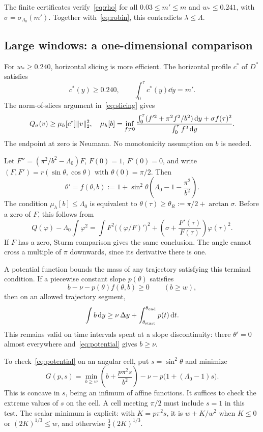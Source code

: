 The finite certificates verify~\eqref{eq:rho} for all $0.03\le m'\le m$ and $w_*\le0.241$, with $\sigma=\sigma_{\Lambda_0}(m')$. Together with~\eqref{eq:robin}, this contradicts $\lambda\le\Lambda$.

\subsection{Large windows: a one-dimensional comparison}
For $w_*\ge0.240$, horizontal slicing is more efficient. The horizontal profile $c^*$ of $D^*$ satisfies
\[
 c^*(y)\ge0.240,\qquad \int_0^\tau c^*(y)\dd y=m'.
\]
The norm-of-slices argument in~\eqref{eq:slicing} gives
\[
 Q_\sigma(v)\ge \mu_h[c^*]\lVert v\rVert_2^2,
\quad
 \mu_h[b]=\inf_{f\ne0}
 \frac{\int_0^\tau(f'^2+\pi^2f^2/b^2)\,\mathrm d y+\sigma f(\tau)^2}
      {\int_0^\tau f^2\,\mathrm d y}.
\]
The endpoint at zero is Neumann. No monotonicity assumption on $b$ is needed.

Let $F''=(\pi^2/b^2-\Lambda_0)F$, $F(0)=1$, $F'(0)=0$, and write $(F,F')=r(\sin\theta,\cos\theta)$ with $\theta(0)=\pi/2$. Then
\begin{equation}\label{eq:prufer-S}
 \theta'=f(\theta,b):=1+\sin^2\theta\left(\Lambda_0-1-\frac{\pi^2}{b^2}\right).
\end{equation}
The condition $\mu_h[b]\le\Lambda_0$ is equivalent to $\theta(\tau)\ge\theta_R:=\pi/2+\arctan\sigma$. Before a zero of $F$, this follows from
\[
 Q(\varphi)-\Lambda_0\int\varphi^2
 =\int F^2\bigl((\varphi/F)'\bigr)^2
   +\left(\sigma+\frac{F'(\tau)}{F(\tau)}\right)\varphi(\tau)^2.
\]
If $F$ has a zero, Sturm comparison gives the same conclusion. The angle cannot cross a multiple of $\pi$ downwards, since its derivative there is one.

A potential function bounds the mass of any trajectory satisfying this terminal condition. If a piecewise constant slope $p(\theta)$ satisfies
\begin{equation}\label{eq:potential}
 b-\nu-p(\theta)f(\theta,b)\ge0\qquad(b\ge w),
\end{equation}
then on an allowed trajectory segment,
\[
 \int b\,\mathrm d y\ge \nu\,\Delta y+\int_{\theta_{\rm start}}^{\theta_{\rm end}}p(t)\,\mathrm d t.
\]
This remains valid on time intervals spent at a slope discontinuity: there $\theta'=0$ almost everywhere and~\eqref{eq:potential} gives $b\ge\nu$.

To check~\eqref{eq:potential} on an angular cell, put $s=\sin^2\theta$ and minimize
\[
 G(p,s)=\min_{b\ge w}\left(b+\frac{p\pi^2s}{b^2}\right)
                 -\nu-p\bigl(1+(\Lambda_0-1)s\bigr).
\]
This is concave in $s$, being an infimum of affine functions. It suffices to check the extreme values of $s$ on the cell. A cell meeting $\pi/2$ must include $s=1$ in this test. The scalar minimum is explicit: with $K=p\pi^2s$, it is $w+K/w^2$ when $K\le0$ or $(2K)^{1/3}\le w$, and otherwise $\frac32(2K)^{1/3}$.

